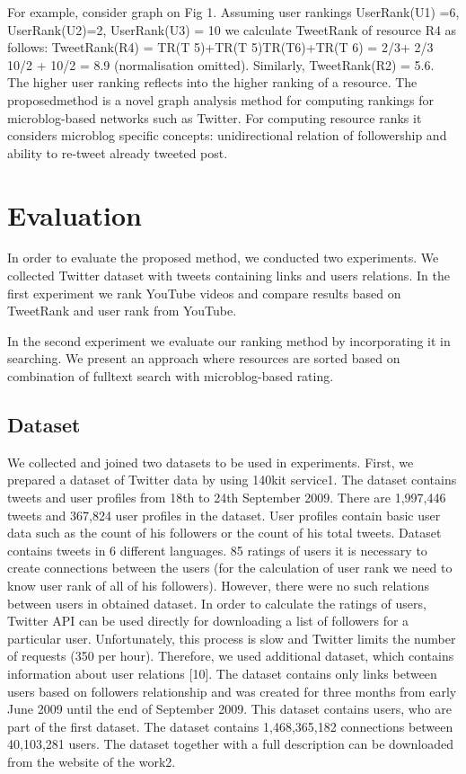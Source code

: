 \documentclass[]{article}
\begin{document}
For example, consider graph on Fig 1. Assuming user rankings UserRank(U1)
=6, UserRank(U2)=2, UserRank(U3) = 10 we calculate TweetRank of resource
R4 as follows: TweetRank(R4) = TR(T 5)+TR(T 5)TR(T6)+TR(T 6) = 2/3+
2/3  10/2 + 10/2 = 8.9 (normalisation omitted). Similarly, TweetRank(R2) =
5.6. The higher user ranking reflects into the higher ranking of a resource.
The proposedmethod is a novel graph analysis method for computing rankings
for microblog-based networks such as Twitter. For computing resource ranks it
considers microblog specific concepts: unidirectional relation of followership and
ability to re-tweet already tweeted post.

\section {Evaluation}
In order to evaluate the proposed method, we conducted two experiments. We
collected Twitter dataset with tweets containing links and users relations. In
the first experiment we rank YouTube videos and compare results based on
TweetRank and user rank from YouTube.

In the second experiment we evaluate our ranking method by incorporating
it in searching. We present an approach where resources are sorted based on
combination of fulltext search with microblog-based rating.

\subsection {Dataset}
We collected and joined two datasets to be used in experiments. First, we prepared
a dataset of Twitter data by using 140kit service1. The dataset contains
tweets and user profiles from 18th to 24th September 2009. There are 1,997,446
tweets and 367,824 user profiles in the dataset. User profiles contain basic user
data such as the count of his followers or the count of his total tweets. Dataset
contains tweets in 6 different languages. 85 %
ratings of users it is necessary to create connections between the users
(for the calculation of user rank we need to know user rank of all of his followers).
However, there were no such relations between users in obtained dataset.
In order to calculate the ratings of users, Twitter API can be used directly for
downloading a list of followers for a particular user. Unfortunately, this process
is slow and Twitter limits the number of requests (350 per hour). Therefore,
we used additional dataset, which contains information about user relations
[10]. The dataset contains only links between users based on followers relationship
and was created for three months from early June 2009 until the end of
September 2009. This dataset contains users, who are part of the first dataset.
The dataset contains 1,468,365,182 connections between 40,103,281 users. The
dataset together with a full description can be downloaded from the website of
the work2.
\end{document}
